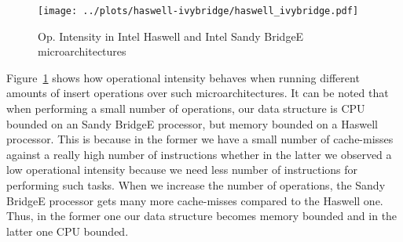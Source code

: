 \begin{figure}\centering
  	\texttt{[image: ../plots/haswell-ivybridge/haswell\_ivybridge.pdf]}
	\caption{Op. Intensity in Intel Haswell and Intel Sandy BridgeE microarchitectures}
	\label{fig:haswell_ivybridge}
\end{figure}

Figure~\ref{fig:haswell_ivybridge} shows how operational intensity behaves when running different amounts of insert operations over such microarchitectures. It can be noted that when performing a small number of operations, our data structure is CPU bounded on an Sandy BridgeE processor, but memory bounded on a Haswell processor. This is because in the former we have a small number of cache-misses against a really high number of instructions whether in the latter we observed a low operational intensity because we need less number of instructions for performing such tasks. When we increase the number of operations, the Sandy BridgeE processor gets many more cache-misses compared to the Haswell one. Thus, in the former one our data structure becomes memory bounded and in the latter one CPU bounded.


